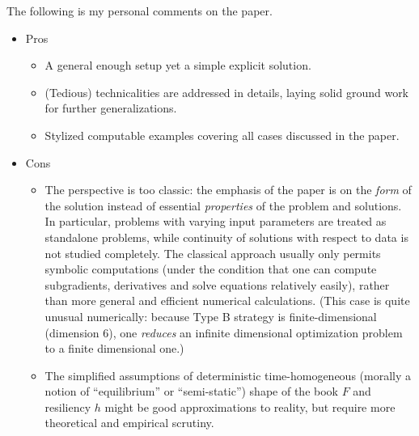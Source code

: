 \documentclass[openany,oneside]{article}
\theoremstyle{definition}
\theoremstyle{remark}
\begin{document}
The following is my personal comments on the paper.
\begin{itemize}
\item Pros

\begin{itemize}
\item A general enough setup yet a simple explicit solution.
\item (Tedious) technicalities are addressed in details, laying solid ground work for further generalizations. \item Stylized computable examples covering all cases discussed in the paper.
\end{itemize}

\item Cons

\begin{itemize}
\item The perspective is too classic: the emphasis of the paper is on the \emph{form} of the solution instead of essential \emph{properties} of the problem and solutions. In particular, problems with varying input parameters are treated as standalone problems, while continuity of solutions with respect to data is not studied completely. The classical approach usually only permits symbolic computations (under the condition that one can compute subgradients, derivatives and solve equations relatively easily), rather than more general and efficient numerical calculations. (This case is quite unusual numerically: because Type B strategy is finite-dimensional (dimension $6$), one \emph{reduces} an infinite dimensional optimization problem to a finite dimensional one.)
\item The simplified assumptions of deterministic time-homogeneous (morally a notion of ``equilibrium'' or ``semi-static'') shape of the book $F$ and resiliency $h$ might be good approximations to reality, but require more theoretical and empirical scrutiny.
\end{itemize}

\end{itemize}
\end{document}
